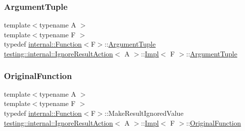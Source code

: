 \mbox{\label{classtesting_1_1internal_1_1_ignore_result_action_1_1_impl_a1e3be49f0be40b497a57fc462ed3fa23}} 
\subsubsection{\texorpdfstring{ArgumentTuple}{ArgumentTuple}\hspace{0.1cm}{\footnotesize\ttfamily [3/3]}}
{\footnotesize\ttfamily template$<$typename A $>$ \\
template$<$typename F $>$ \\
typedef \mbox{\hyperlink{structtesting_1_1internal_1_1_function}{internal\+::\+Function}}$<$F$>$\+::\mbox{\hyperlink{classtesting_1_1_action_interface_af72720d864da4d606629e83edc003511}{Argument\+Tuple}} \mbox{\hyperlink{classtesting_1_1internal_1_1_ignore_result_action}{testing\+::internal\+::\+Ignore\+Result\+Action}}$<$ A $>$\+::\mbox{\hyperlink{classtesting_1_1internal_1_1_ignore_result_action_1_1_impl}{Impl}}$<$ F $>$\+::\mbox{\hyperlink{classtesting_1_1_action_interface_af72720d864da4d606629e83edc003511}{Argument\+Tuple}}}

\mbox{\label{classtesting_1_1internal_1_1_ignore_result_action_1_1_impl_a00db745de37ebae1ee631240098bc2b1}} 
\subsubsection{\texorpdfstring{OriginalFunction}{OriginalFunction}\hspace{0.1cm}{\footnotesize\ttfamily [1/3]}}
{\footnotesize\ttfamily template$<$typename A $>$ \\
template$<$typename F $>$ \\
typedef \mbox{\hyperlink{structtesting_1_1internal_1_1_function}{internal\+::\+Function}}$<$F$>$\+::Make\+Result\+Ignored\+Value \mbox{\hyperlink{classtesting_1_1internal_1_1_ignore_result_action}{testing\+::internal\+::\+Ignore\+Result\+Action}}$<$ A $>$\+::\mbox{\hyperlink{classtesting_1_1internal_1_1_ignore_result_action_1_1_impl}{Impl}}$<$ F $>$\+::\mbox{\hyperlink{classtesting_1_1internal_1_1_ignore_result_action_1_1_impl_a00db745de37ebae1ee631240098bc2b1}{Original\+Function}}\hspace{0.3cm}{\ttfamily [private]}}

